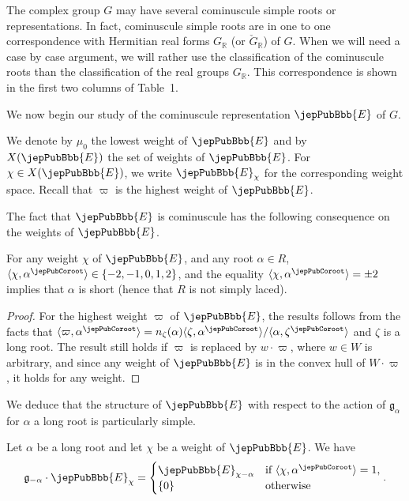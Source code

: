 \begin{remark}
The complex group $G$ may have several cominuscule simple roots or representations. In fact, cominuscule simple roots are in one to one correspondence with Hermitian real forms $G_{\mathbb R}$ (or $\check G_{\mathbb R}$) of $G$. When we will need a case by case argument, we will rather use the classification of the cominuscule roots than the classification of the real groups $G_{\mathbb R}$. This correspondence is shown in the first two columns of Table~1.
\end{remark}
We now begin our study of the cominuscule representation $\jepPubBbb{E}$ of $G$.
\begin{notation}
We denote by $\mu_0$ the lowest weight of $\jepPubBbb{E}$ and by $X(\jepPubBbb{E})$ the set of weights of $\jepPubBbb{E}$. For $\chi\in X(\jepPubBbb{E})$, we write $\jepPubBbb{E}_\chi$ for the corresponding weight space. Recall that $\varpi$ is the highest weight of $\jepPubBbb{E}$.
\end{notation}
The fact that $\jepPubBbb{E}$ is cominuscule has the following consequence on the weights of $\jepPubBbb{E}$.
\begin{lemma}
For any weight $\chi$ of $\jepPubBbb{E}$, and any root $\alpha\in R$, $\langle\chi,\alpha^\jepPubCoroot\rangle\in\{-2,-1,0,1,2\}$, and the equality $\langle\chi,\alpha^\jepPubCoroot\rangle=\pm2$ implies that $\alpha$ is short (hence that $R$ is not simply laced).
\end{lemma}
\begin{proof}
For the highest weight $\varpi$ of $\jepPubBbb{E}$, the results follows from the facts that $\langle\varpi,\alpha^\jepPubCoroot\rangle=n_\zeta(\alpha)\langle\zeta,\alpha^\jepPubCoroot\rangle/\langle\alpha,\zeta^\jepPubCoroot\rangle$ and $\zeta$ is a long root. The result still holds if $\varpi$ is replaced by $w\cdot\varpi$, where $w\in W$ is arbitrary, and since any weight of $\jepPubBbb{E}$ is in the convex hull of $W\cdot\varpi$, it holds for any weight.
\end{proof}
We deduce that the structure of $\jepPubBbb{E}$ with respect to the action of $\mathfrak g_\alpha$ for $\alpha$ a long root is particularly simple.
\begin{lemma}
Let $\alpha$ be a long root and let $\chi$ be a weight of $\jepPubBbb{E}$. We have
\[
\mathfrak g_{-\alpha}\cdot \jepPubBbb{E}_\chi=\begin{cases}\jepPubBbb{E}_{\chi-\alpha}&\text{if }\langle\chi,\alpha^\jepPubCoroot\rangle=1,\\\{0\}&\text{otherwise}\end{cases}.
\]
\end{lemma}
